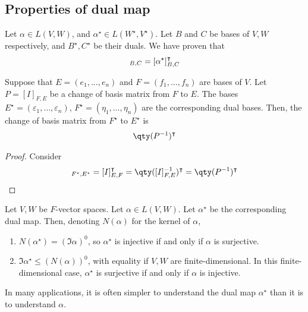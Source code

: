 \subsection{Properties of dual map}
Let $\alpha \in L(V,W)$, and $\alpha^\star \in L(W^\star, V^\star)$.
Let $B$ and $C$ be bases of $V, W$ respectively, and $B^\star, C^\star$ be their duals.
We have proven that
\begin{align*}
	[\alpha]_{B,C} = [\alpha^\star]^\transpose_{B,C}
\end{align*}
\begin{lemma}
	Suppose that $E = (e_1, \dots, e_n)$ and $F = (f_1, \dots, f_n)$ are bases of $V$.
	Let $P = [I]_{F, E}$ be a change of basis matrix from $F$ to $E$.
	The bases $E^\star = (\varepsilon_1, \dots, \varepsilon_n)$, $F^\star = (\eta_1, \dots, \eta_n)$ are the corresponding dual bases.
	Then, the change of basis matrix from $F^\star$ to $E^\star$ is
	\begin{align*}
		\qty(P^{-1})^\transpose
	\end{align*}
\end{lemma}
\begin{proof}
	Consider
	\begin{align*}
		[I]_{F^\star, E^\star} = [I]^\transpose_{E, F} = \qty([I]_{F, E}^{-1})^\transpose = \qty(P^{-1})^\transpose
	\end{align*}
\end{proof}
\begin{lemma}
	Let $V, W$ be $F$-vector spaces.
	Let $\alpha \in L(V, W)$.
	Let $\alpha^\star$ be the corresponding dual map.
	Then, denoting $N(\alpha)$ for the kernel of $\alpha$,
	\begin{enumerate}
		\item $N(\alpha^\star) = (\Im \alpha)^0$, so $\alpha^\star$ is injective if and only if $\alpha$ is surjective.
		\item $\Im \alpha^\star \leq (N(\alpha))^0$, with equality if $V, W$ are finite-dimensional.
		      In this finite-dimensional case, $\alpha^\star$ is surjective if and only if $\alpha$ is injective.
	\end{enumerate}
\end{lemma}
\begin{remark}
	In many applications, it is often simpler to understand the dual map $\alpha^\star$ than it is to understand $\alpha$.
\end{remark}
